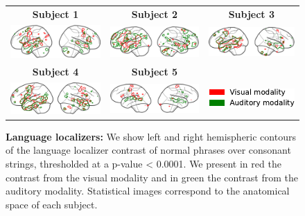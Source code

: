\begin{figure}[ht]
\scriptsize
\hspace{-4ex}
\begin{tabular}{ccc}
\textbf{\Large Subject 1} & \textbf{\Large Subject 2} & \textbf{\Large Subject 3}\\
{\includegraphics[width=.33\linewidth]{figures/part_II/langloc_01.pdf}}
\hspace{-1ex}
&{\includegraphics[width=.33\linewidth]{figures/part_II/langloc_03.pdf}}
\hspace{-1ex}
&{\includegraphics[width=.33\linewidth]{figures/part_II/langloc_04.pdf}}
\hspace{-1ex}\\
\rule{0pt}{6ex}
\textbf{\Large Subject 4} & \textbf{\Large Subject 5} & {}\\
{\includegraphics[width=.33\linewidth]{figures/part_II/langloc_05.pdf}}
\hspace{-1ex}
&{\includegraphics[width=.33\linewidth]{figures/part_II/langloc_06.pdf}}
\hspace{-1ex}
&{\includegraphics[width=.2\linewidth]{figures/part_II/langloc_legend.pdf}}
\hspace{-1ex} \\
\end{tabular}
\vspace{3ex}
\caption{\textbf{Language localizers:} We show left and right hemispheric contours of the language localizer contrast of normal phrases over consonant strings, thresholded at a p-value < 0.0001.
We present in red the contrast from the visual modality and in green the contrast from the auditory modality. Statistical images correspond to the anatomical space of each subject.}
\label{fig:language_localizers}
\end{figure}


